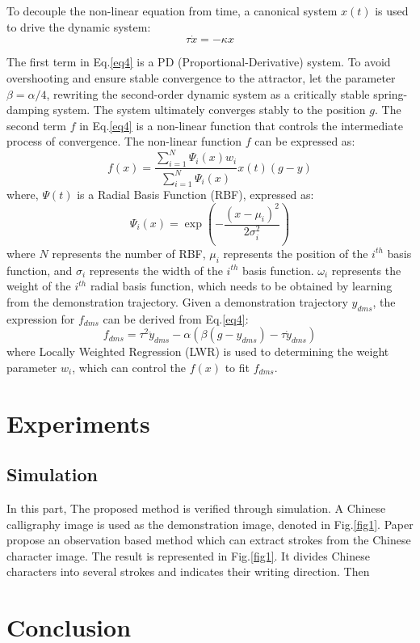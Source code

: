 \documentclass[journal]{IEEEtran}
\begin{document}
To decouple the non-linear equation from time, a canonical system $x(t)$ is used to drive the dynamic system:
\begin{equation}
    \tau \dot x = - \kappa x
\end{equation}

The first term in Eq.\ref{eq4} is a PD (Proportional-Derivative) system. To avoid overshooting and ensure stable convergence to the attractor, let the parameter $\beta = \alpha / 4$, rewriting the second-order dynamic system as a critically stable spring-damping system. The system ultimately converges stably to the position $g$. The second term $f$ in Eq.\ref{eq4} is a non-linear function that controls the intermediate process of convergence. The non-linear function $f$ can be expressed as:
\begin{equation}
    f(x)=\frac{\sum\limits_{i=1}^{N} \Psi_{i}(x) w_{i}}{\sum\limits_{i=1}^{N} \Psi_{i}(x)}x(t)(g-y)
    \label{eq5}
\end{equation}
where, $\Psi(t)$ is a Radial Basis Function (RBF), expressed as:
\begin{equation}
    \Psi_i(x)= \exp \left(-\frac{\left(x-\mu_i \right)^{2}}{2 \sigma_i^{2}}\right)
\end{equation}
where $N$ represents the number of RBF, $\mu_i$ represents the position of the $i^{th}$ basis function, and $\sigma_i$ represents the width of the $i^{th}$ basis function. $\omega_i$ represents the weight of the $i^{th}$ radial basis function, which needs to be obtained by learning from the demonstration trajectory. Given a demonstration trajectory $y_{dms}$, the expression for $f_{dms}$ can be derived from Eq.\ref{eq4}:
\begin{equation}
    f_{dms} = \tau^2 \ddot y_{dms} - \alpha(\beta (g-y_{dms})-\tau \dot y_{dms})
    \label{eq6}
\end{equation}
where Locally Weighted Regression (LWR) is used to determining the weight parameter $w_{i}$, which can control the $f(x)$ to fit $f_{dms}$.

\section{Experiments}
\subsection{Simulation}
In this part, The proposed method is verified through simulation. A Chinese calligraphy image is used as the demonstration image, denoted in Fig.\ref{fig1}. Paper \cite{Li2022} propose an observation based method which can extract strokes from the Chinese character image. The result is represented in Fig.\ref{fig1}. It divides Chinese characters into several strokes and indicates their writing direction. Then 


\section{Conclusion}


\end{document}
